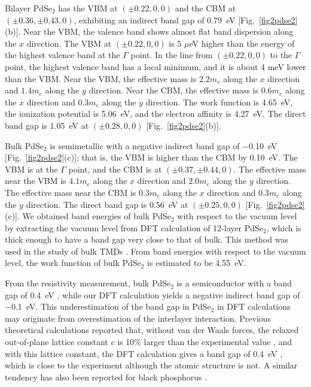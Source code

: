 \documentclass[aps,prb,longbibliography,twocolumn]{revtex4-2}
\begin{document}
Bilayer PdSe$_2$ has the VBM at $(\pm0.22,0,0)$ and the CBM at $(\pm0.36,\pm0.43,0)$,
exhibiting an indirect band gap of 0.79~eV [Fig.~\ref{fig2pdse2}(b)].
Near the VBM, the valence band shows almost flat band dispersion along the $x$ direction.
The VBM at $(\pm0.22,0,0)$ is 5 $\mu$eV higher than the energy of the highest valence band at the $\Gamma$ point.
In the line from $(\pm0.22,0,0)$ to the $\Gamma$ point, the highest valence band 
has a local minimum, and it is about 4 meV lower than the VBM.
Near the VBM, the effective mass is $2.2m_e$ along the $x$ direction
and $1.4m_e$ along the $y$ direction.
Near the CBM, the effective mass is $0.6m_e$ along the $x$ direction
and $0.3m_e$ along the $y$ direction.
The work function is 4.65~eV, the ionization potential is 5.06~eV, and the electron affinity is 4.27~eV.
The direct band gap is 1.05~eV at $(\pm0.28,0,0)$ [Fig.~\ref{fig2pdse2}(b)].



Bulk PdSe$_2$ is semimetallic with a negative indirect band gap 
of $-$0.10~eV [Fig.~\ref{fig2pdse2}(c)]; that is, the VBM 
is higher than the CBM by 0.10~eV. 
The VBM is at the $\Gamma$ point, and the CBM is at $(\pm0.37,\pm0.44,0)$.
The effective mass near the VBM is $4.1m_e$ along the $x$ direction
and $2.0m_e$ along the $y$ direction.
The effective mass near the CBM is $0.3m_e$ along the $x$ direction
and $0.3m_e$ along the $y$ direction.
The direct band gap is 0.56~eV at $(\pm0.25,0,0)$ [Fig.~\ref{fig2pdse2}(c)].
We obtained band energies of bulk PdSe$_2$ 
with respect to the vacuum level by extracting the vacuum level from 
DFT calculation of 12-layer PdSe$_2$, which is thick enough to have 
a band gap very close to that of bulk. This method was used in the study of
bulk TMDs \cite{Kim2021}.
From band energies with respect to the vacuum level,
the work function of bulk PdSe$_2$ is estimated to be 4.55~eV.


From the resistivity measurement, bulk PdSe$_2$ is a semiconductor 
with a band gap of 0.4~eV \cite{Hulliger1965}, 
while our DFT calculation yields a negative indirect band gap of $-0.1$~eV. 
This underestimation of the band gap in PdSe$_2$ in DFT calculations
may originate from overestimation of the interlayer interaction.
Previous theoretical calculations reported that, without van der Waals 
forces, the relaxed out-of-plane lattice constant $c$ is 
10\% larger than the experimental 
value \cite{Oyedele2017}, and with this lattice constant, 
the DFT calculation gives a band gap of 0.4~eV \cite{Oyedele2017}, 
which is close to the experiment although the atomic structure is not. 
A similar tendency has also been reported for black phosphorus \cite{Baik2015}.
\end{document}
